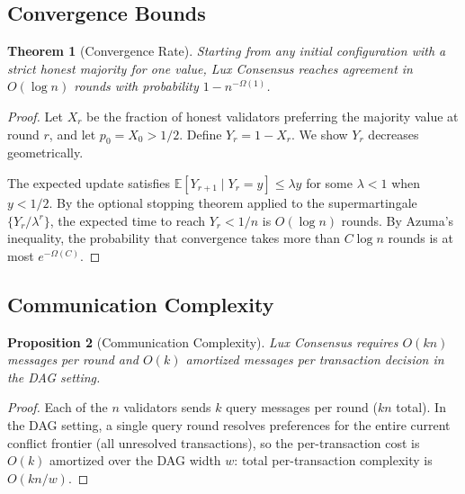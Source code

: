 \documentclass[11pt,a4paper]{article}
\newtheorem{theorem}{Theorem}[section]
\newtheorem{proposition}[theorem]{Proposition}
\begin{document}
\subsection{Convergence Bounds}

\begin{theorem}[Convergence Rate]
\label{thm:convergence}
Starting from any initial configuration with a strict honest majority for one value,
Lux Consensus reaches agreement in $O(\log n)$ rounds with probability
$1 - n^{-\Omega(1)}$.
\end{theorem}

\begin{proof}
Let $X_r$ be the fraction of honest validators preferring the majority value at round $r$,
and let $p_0 = X_0 > 1/2$. Define $Y_r = 1 - X_r$. We show $Y_r$ decreases geometrically.

The expected update satisfies $\mathbb{E}[Y_{r+1} \mid Y_r = y] \leq \lambda y$ for some
$\lambda < 1$ when $y < 1/2$. By the optional stopping theorem applied to the
supermartingale $\{Y_r / \lambda^r\}$, the expected time to reach $Y_r < 1/n$ is
$O(\log n)$ rounds. By Azuma's inequality, the probability that convergence takes more
than $C \log n$ rounds is at most $e^{-\Omega(C)}$.
\end{proof}

\subsection{Communication Complexity}

\begin{proposition}[Communication Complexity]
\label{prop:comm}
Lux Consensus requires $O(kn)$ messages per round and $O(k)$ amortized messages per
transaction decision in the DAG setting.
\end{proposition}

\begin{proof}
Each of the $n$ validators sends $k$ query messages per round ($kn$ total). In the DAG
setting, a single query round resolves preferences for the entire current conflict frontier
(all unresolved transactions), so the per-transaction cost is $O(k)$ amortized over the
DAG width $w$: total per-transaction complexity is $O(kn/w)$.
\end{proof}
\end{document}
